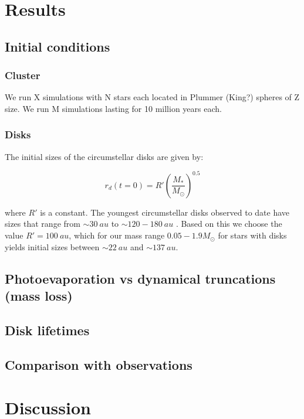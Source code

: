 \documentclass[fleqn,usenatbib]{mnras}
\begin{document}
\section{Results}
\label{sec:results}

\subsection{Initial conditions}\label{ics}
\subsubsection{Cluster}
We run X simulations with N stars each located in Plummer (King?) spheres of Z size. We run M simulations lasting for 10 million years each. 

\subsubsection{Disks}\label{initdisks}
The initial sizes of the circumstellar disks are given by:

\begin{equation}
r_d(t=0) = R'\left(\frac{M_*}{M_\odot}\right)^{0.5}
\end{equation}

\noindent
where $R'$ is a constant. The youngest circumstellar disks observed to date have sizes that range from $\sim\SI{30}{au}$ \citep[e.g.][]{lee2018} to $\sim120-\SI{180}{au}$ \citep[e.g.][]{murillo2013,vanthoff2018}. Based on this we choose the value $R' = \SI{100}{au}$, which for our mass range $0.05-1.9 M_\odot$ for stars with disks yields initial sizes between $\sim\SI{22}{au}$ and $\sim\SI{137}{au}$.

\subsection{Photoevaporation vs dynamical truncations (mass loss)}

\subsection{Disk lifetimes}

\subsection{Comparison with observations}

\section{Discussion}
\label{sec:discussion}
\end{document}

